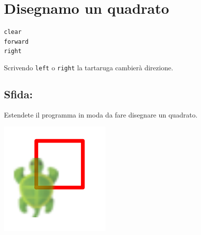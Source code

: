 \chapter{Disegnamo un quadrato}
\begin{multicols}{2}

\begin{lstlisting}[basicstyle={\ttfamily\fontsize{30}{36}\selectfont},numbers=none]
clear
forward
right
\end{lstlisting}
        
 Scrivendo \lstinline{left} o \lstinline{right} la tartaruga cambierà direzione.
\section*{\color{BrickRed}Sfida:}
Estendete il programma in moda da fare disegnare un quadrato.

\columnbreak

\begin{center}
\includegraphics{../img/square.png}
\end{center}

\end{multicols}

